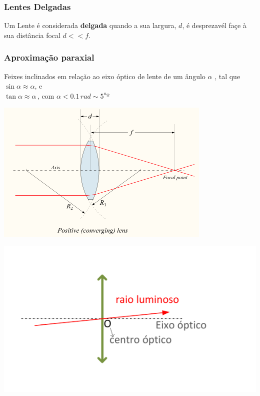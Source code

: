 \documentclass[a4paper,12pt]{article}      %
\begin{document}
\subsubsection{\sf Lentes Delgadas}
Um Lente é considerada \textbf{delgada} quando a sua largura, $d$, é desprezavél façe à sua distância focal $d << f$.
\subsubsection{\sf Aproximação paraxial}
Feixes inclinados em relação ao eixo óptico de lente de um ângulo $\alpha$ , tal que
$\sin \alpha \approx \alpha$, e \\
 $\tan \alpha \approx \alpha\,$, com $\alpha < 0.1\,rad \sim 5^oº $

\begin{minipage}[c]{0.45\textwidth}
	\includegraphics[width=\textwidth]{thinLens}
\end{minipage}
\begin{minipage}[c]{0.45\textwidth}
	\includegraphics[width=\textwidth]{paraxial}
\end{minipage}
\end{document}
